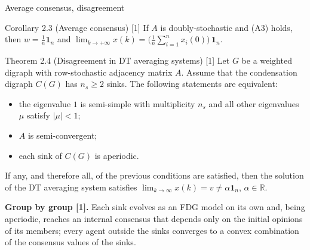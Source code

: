 \begin{frame}[label=bk-fdg-thm2]{Average consensus, disagreement}
  \scriptsize
  \begin{block}{Corollary 2.3 (Average consensus) [1]}
    If $A$ is doubly-stochastic and (A3) holds, then $w = \frac{1}{n}\mathbf{1}_n$ and
    $\lim_{k \to +\infty} x(k) = \big(\frac{1}{n}\sum_{i=1}^{n} x_i(0)\big)\, \mathbf{1}_n$.
  \end{block}
  \begin{block}{Theorem 2.4 (Disagreement in DT averaging systems) [1]}
    Let $G$ be a weighted digraph with row-stochastic adjacency matrix $A$. Assume that the
    condensation digraph $C(G)$ has $n_s \geq 2$ sinks. The following statements are
    equivalent:
    \begin{itemize}
      \item[(A1)] the eigenvalue $1$ is semi-simple with multiplicity $n_s$ and all other
                  eigenvalues $\mu$ satisfy $|\mu| < 1$;
      \item[(A2)] $A$ is semi-convergent;
      \item[(A3)] each sink of $C(G)$ is aperiodic.
    \end{itemize}
    If any, and therefore all, of the previous conditions are satisfied, then the solution
    of the DT averaging system satisfies
    $\lim_{k \to \infty} x(k) = v \neq \alpha \mathbf{1}_n$, $\alpha \in \mathbb{R}$.
  \end{block}
  \textbf{Group by group [1].} Each sink evolves as an FDG model on its own and, being
  aperiodic, reaches an internal consensus that depends only on the initial opinions of its
  members; every agent outside the sinks converges to a convex combination of the consensus
  values of the sinks.
\end{frame}

